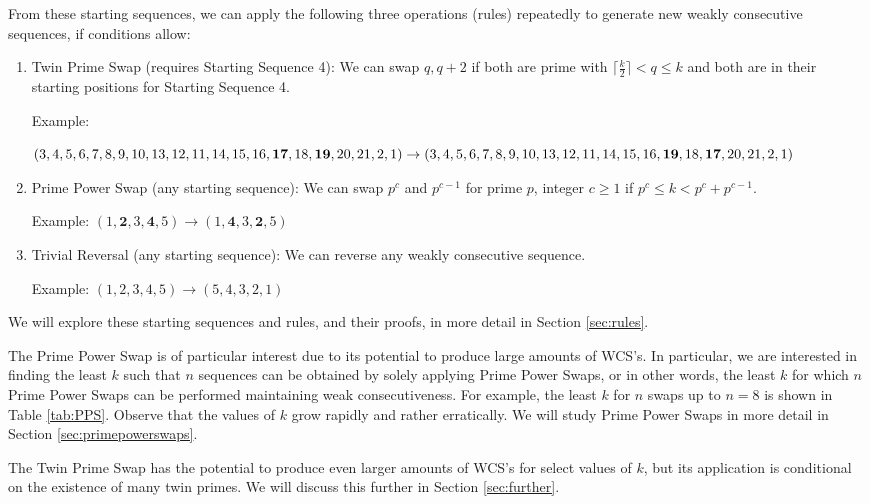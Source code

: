 \documentclass{article}
\newcommand{\ceil}[1]{\lceil #1 \rceil}
\theoremstyle{definition}
\theoremstyle{remark}
\numberwithin{equation}{section}
\numberwithin{case}{theorem}
\begin{document}
From these starting sequences, we can apply the following three operations (rules) repeatedly to generate new weakly consecutive sequences, if conditions allow:
\begin{enumerate}
    \item Twin Prime Swap (requires Starting Sequence 4): We can swap $q,q+2$ if both are prime with $\ceil{\frac{k}{2}} < q \leq k$ and both are in their starting positions for Starting Sequence 4.

    Example: 
    
    $(3,4,5,6,7,8,9,10,13,12,11,14,15,16,\mathbf{17},18,\mathbf{19},20,21,2,1) \to \\
    (3,4,5,6,7,8,9,10,13,12,11,14,15,16,\mathbf{19},18,\mathbf{17},20,21,2,1)$
    \item Prime Power Swap (any starting sequence): We can swap $p^c$ and $p^{c-1}$ for prime $p$, integer $c \geq 1$ if $p^c \leq k < p^c + p^{c-1}$.

    Example: $(1,\mathbf{2},3,\mathbf{4},5) \to (1,\mathbf{4},3,\mathbf{2},5)$
    \item Trivial Reversal (any starting sequence): We can reverse any weakly consecutive sequence.

    Example: $(1,2,3,4,5) \to (5,4,3,2,1)$
\end{enumerate}

We will explore these starting sequences and rules, and their proofs, in more detail in Section \ref{sec:rules}.


The Prime Power Swap is of particular interest due to its potential to produce large amounts of WCS's. In particular, we are interested in finding the least $k$ such that $n$ sequences can be obtained by solely applying Prime Power Swaps, or in other words, the least $k$ for which $n$ Prime Power Swaps can be performed maintaining weak consecutiveness. For example, the least $k$ for $n$ swaps up to $n=8$ is shown in Table \ref{tab:PPS}. Observe that the values of $k$ grow rapidly and rather erratically. We will study Prime Power Swaps in more detail in Section \ref{sec:primepowerswaps}.

The Twin Prime Swap has the potential to produce even larger amounts of WCS's for select values of $k$, but its application is conditional on the existence of many twin primes. We will discuss this further in Section \ref{sec:further}.
\end{document}
